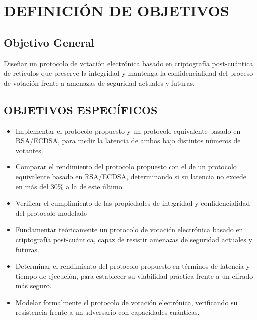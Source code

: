 \section{DEFINICIÓN DE OBJETIVOS}

\subsection{Objetivo General}
Diseñar un protocolo de votación electrónica basado en criptografía post-cuántica de retículos que preserve la integridad y mantenga la confidencialidad del proceso de votación frente a amenazas de seguridad actuales y futuras. 


\subsection{OBJETIVOS ESPECÍFICOS}
\begin{itemize}

	\item Implementar el protocolo propuesto y un protocolo equivalente basado en RSA/ECDSA, para medir la latencia de ambos bajo distintos números de votantes.
	
	\item Comparar el rendimiento del protocolo propuesto con el de un protocolo equivalente basado en RSA/ECDSA, determinando si su latencia no excede en más del 30\% a la de este último.
	
			\item Verificar  el cumplimiento de las propiedades de integridad y confidencialidad del protocolo modelado
	
	\item Fundamentar teóricamente un protocolo de votación electrónica basado en criptografía post-cuántica, capaz de resistir amenazas de seguridad actuales y futuras.
	
	\item Determinar el rendimiento del protocolo propuesto en términos de latencia y tiempo de ejecución, para establecer su viabilidad práctica frente a un cifrado más seguro.
	
	\item Modelar formalmente el protocolo de votación electrónica, verificando  su resistencia frente a un adversario con capacidades cuánticas.
	
\end{itemize}